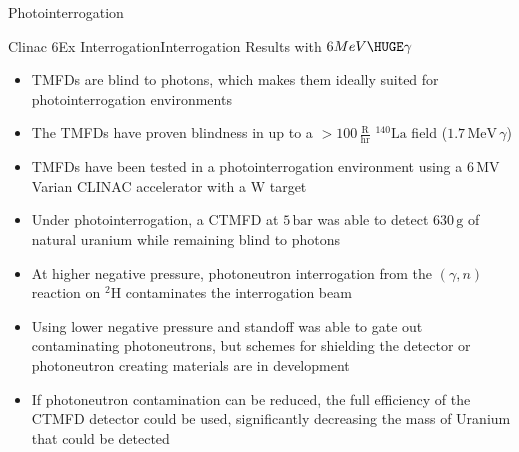\begin{col}{6}{12}
  \def\numheadings{2}
  \begin{cell}{6}{8}{Photointerrogation}{}
    \begin{col}{2}{8}
      \begin{cell}{2}{5}{Clinac 6Ex Interrogation}{Interrogation Results with $6 MeV {\HUGE \gamma}$}
        \begin{itemize}
          \item TMFDs are blind to photons, which makes them ideally suited for photointerrogation environments
          \item The TMFDs have proven blindness in up to a $>100\,\mathrm{\frac{R}{hr}}$ $\mathrm{^{140}La}$ field ($1.7\,\mathrm{MeV}\,\gamma$)
          \item TMFDs have been tested in a photointerrogation environment using a $6\,\mathrm{MV}$ Varian CLINAC accelerator with a $\mathrm{W}$ target
          \item Under photointerrogation, a CTMFD at $5\,\mathrm{bar}$ was able to detect $630\,\mathrm{g}$ of natural uranium while remaining blind to photons
          \item At higher negative pressure, photoneutron interrogation from the $\left(\gamma,n\right)$ reaction on $\mathrm{^{2}H}$ contaminates the interrogation beam
          \item Using lower negative pressure and standoff was able to gate out contaminating photoneutrons, but schemes for shielding the detector or photoneutron creating materials are in development
          \item If photoneutron contamination can be reduced, the full efficiency of the CTMFD detector could be used, significantly decreasing the mass of Uranium that could be detected
        \end{itemize}
      \end{cell} \\
      \vspace*{\fill}
      \begin{cell}{2}{3}{}{}
      \end{cell}
    \end{col}%
    \begin{col}{4}{8}
      \begin{cell}{4}{3}{}{}

\end{cell}
\end{col}
\end{cell}
\end{col}
